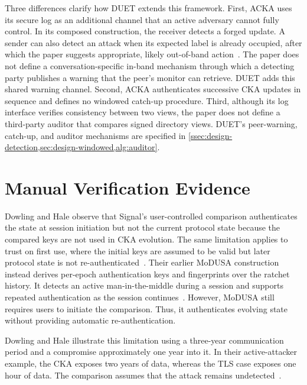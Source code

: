 Three differences clarify how DUET extends this framework. First, ACKA uses its secure log as an
additional channel that an active adversary cannot fully
control. In its composed construction, the receiver detects a
forged update. A sender can also detect an attack when its expected label is already occupied, after
which the paper suggests appropriate, likely out-of-band
action~\cite{dowling2023acka}. The paper does not define a conversation-specific
in-band mechanism through which a detecting party publishes a warning that the peer's monitor can
retrieve. DUET adds this shared warning channel. Second, ACKA authenticates successive CKA updates
in sequence and defines no windowed catch-up procedure. Third, although its log interface verifies
consistency between two views, the paper does not define a third-party auditor that compares signed
directory views. DUET's peer-warning, catch-up, and auditor mechanisms are specified in
\cref{ssec:design-detection,sec:design-windowed,alg:auditor}.

\section{Manual Verification Evidence}\label{sec:ext-usability}

Dowling and Hale observe that Signal's user-controlled comparison authenticates the state at session
initiation but not the current protocol state because the compared keys are not used in CKA
evolution. The same limitation applies to trust on first use, where the initial keys are assumed to
be valid but later protocol state is not re-authenticated~\cite{dowling2023acka}. Their
earlier MoDUSA construction instead derives per-epoch authentication keys and fingerprints over the
ratchet history. It detects an active man-in-the-middle during a session and supports repeated
authentication as the session continues~\cite[Sections~1 and 4]{dowling2020nocompromise}.
However, MoDUSA still requires users to initiate the comparison. Thus, it authenticates evolving
state without providing automatic re-authentication.

Dowling and Hale illustrate this limitation using a three-year communication period and a compromise
approximately one year into it. In their active-attacker example, the CKA exposes two years of data,
whereas the TLS case exposes one hour of data. The comparison assumes that the attack remains
undetected~\cite{dowling2023acka}.

